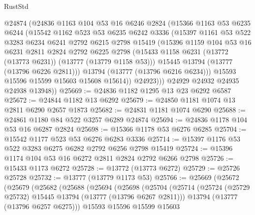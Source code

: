 \begin{lexlean}{RustStd}
\begin{coremodule}
            @24874
            (@24836
              @1163
              @104
              @53
              @16
              @6246
              @2824
              (@15366
                @1163
                @53
                @6235
                @6244
                (@15542
                  @1162
                  @523
                  @53
                  @6235
                  @6242
                  @3336
                  (@15397
                    @1161
                    @53
                    @522
                    @3283
                    @6234
                    @6241
                    @2792
                    @6215
                    @2798
                    @15419
                    (@15396
                      @1159
                      @104
                      @53
                      @16
                      @6231
                      @2811
                      @2824
                      @2792
                      @6225
                      @2798
                      (@15433 @1158 @6231 (@13772 (@13773 @6231)) (@13777 (@13779 @1158 @53)))
                      @15445
                      @13794
                      (@13777 (@13796 @6226 @2811)))
                    @13794
                    (@13777 (@13796 @6216 @6234)))
                  @15593
                  @15596
                  @15599
                  @15603
                  @15608
                  @15614))
              @24923)))
        @24929
        @24932
        @24935
        @24938
        @13948))
@25669 := @24836 @1182 @1295 @13 @23 @6292 @6587
@25672 := @24844 @1182 @13 @6292
@25679 := @24850 @1181 @1074 @13 @2811 @6290 @2657 @1873
@25682 := @24831 @1181 @1074 @6290
@25688 := @24861 @1180 @84 @522 @3257 @6289 @24874
@25694 := @24836 @1178 @104 @53 @16 @6287 @2824
@25698 := @15366 @1178 @53 @6276 @6285
@25704 := @15542 @1177 @523 @53 @6276 @6283 @3336
@25714 := @15397 @1176 @53 @522 @3283 @6275 @6282 @2792 @6256 @2798 @15419
@25724 := @15396 @1174 @104 @53 @16 @6272 @2811 @2824 @2792 @6266 @2798
@25726 := @15433 @1173 @6272
@25728 := @13772 (@13773 @6272)
@25729 := @25726 @25728
@25732 := @13777 (@13779 @1173 @53)
@25766 := @25669
    (@25672
      (@25679
        (@25682
          (@25688
            (@25694
              (@25698
                (@25704
                  (@25714
                    (@25724 (@25729 @25732) @15445 @13794 (@13777 (@13796 @6267 @2811)))
                    @13794
                    (@13777 (@13796 @6257 @6275)))
                  @15593
                  @15596
                  @15599
                  @15603

\end{coremodule}
\end{lexlean}
